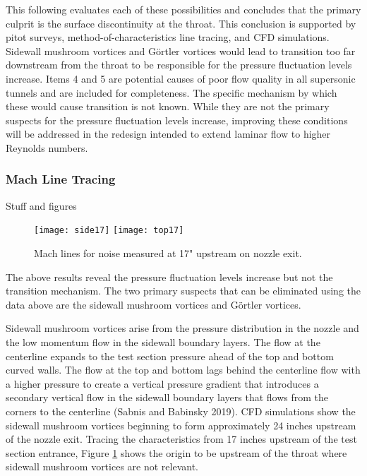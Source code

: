 This following evaluates each of these possibilities and concludes that the primary culprit is the surface discontinuity at the throat. This conclusion is supported by pitot surveys, method-of-characteristics line tracing, and CFD simulations. Sidewall mushroom vortices and Görtler vortices would lead to transition too far downstream from the throat to be responsible for the pressure fluctuation levels increase. Items 4 and 5 are potential causes of poor flow quality in all supersonic tunnels and are included for completeness. The specific mechanism by which these would cause transition is not known. While they are not the primary suspects for the pressure fluctuation levels increase, improving these conditions will be addressed in the redesign intended to extend laminar flow to higher Reynolds numbers.

\subsubsection*{Mach Line Tracing}

Stuff and figures

\begin{figure}[ht]
    \centering
    \texttt{[image: side17]}
    \texttt{[image: top17]}
    \caption{Mach lines for noise measured at 17" upstream on nozzle exit.}
    \label{fig:machlines}
\end{figure}

The above results reveal the pressure fluctuation levels increase but not the transition mechanism. The two primary suspects that can be eliminated using the data above are the sidewall mushroom vortices and Görtler vortices.

Sidewall mushroom vortices arise from the pressure distribution in the nozzle and the low momentum flow in the sidewall boundary layers. The flow at the centerline expands to the test section pressure ahead of the top and bottom curved walls. The flow at the top and bottom lags behind the centerline flow with a higher pressure to create a vertical pressure gradient that introduces a secondary vertical flow in the sidewall boundary layers that flows from the corners to the centerline (Sabnis and Babinsky 2019). CFD simulations show the sidewall mushroom vortices beginning to form approximately 24 inches upstream of the nozzle exit. Tracing the characteristics from 17 inches upstream of the test section entrance, Figure \ref{fig:machlines} shows the origin to be upstream of the throat where sidewall mushroom vortices are not relevant.

